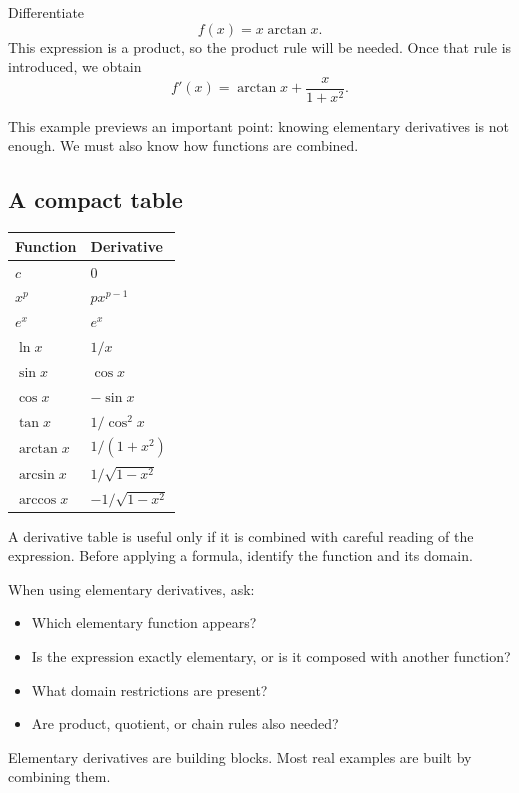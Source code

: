 \begin{examplebox}
Differentiate
\[
f(x)=x\arctan x.
\]
This expression is a product, so the product rule will be needed. Once that rule is introduced, we obtain
\[
f'(x)=\arctan x+\frac{x}{1+x^2}.
\]
\end{examplebox}

This example previews an important point: knowing elementary derivatives is not enough. We must also know how functions are combined.

\subsection*{A compact table}

\begin{center}
\begin{tabular}{ll}
\toprule
Function & Derivative \\
\midrule
\(c\) & \(0\) \\
\(x^p\) & \(p x^{p-1}\) \\
\(e^x\) & \(e^x\) \\
\(\ln x\) & \(1/x\) \\
\(\sin x\) & \(\cos x\) \\
\(\cos x\) & \(-\sin x\) \\
\(\tan x\) & \(1/\cos^2 x\) \\
\(\arctan x\) & \(1/(1+x^2)\) \\
\(\arcsin x\) & \(1/\sqrt{1-x^2}\) \\
\(\arccos x\) & \(-1/\sqrt{1-x^2}\) \\
\bottomrule
\end{tabular}
\end{center}

A derivative table is useful only if it is combined with careful reading of the expression. Before applying a formula, identify the function and its domain.

\begin{summarybox}
When using elementary derivatives, ask:
\begin{itemize}
\item Which elementary function appears?
\item Is the expression exactly elementary, or is it composed with another function?
\item What domain restrictions are present?
\item Are product, quotient, or chain rules also needed?
\end{itemize}
\end{summarybox}

Elementary derivatives are building blocks. Most real examples are built by combining them.